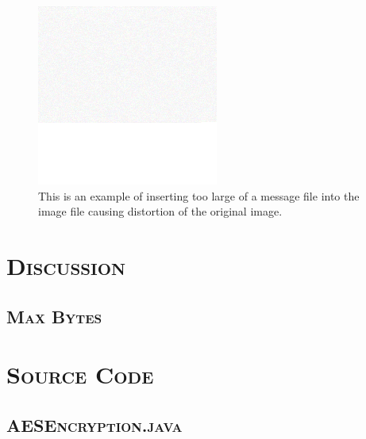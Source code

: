 \documentclass[12pt]{article}
\begin{document}
	\begin{figure}[h]
		\centering
		\includegraphics[keepaspectratio=true, width=0.8\linewidth]{image/bloob.png}
		\caption{This is an example of inserting too large of a message file into the image file causing distortion of the original image.}
	\end{figure}
	
	
	\section[Discussion]{\Large{}\selectfont\scshape Discussion}
	
	\subsection[Max Bytes]{\hspace*{1em}\large{}\selectfont\scshape Max Bytes}
	
	\section[Source Code]{\Large{}\selectfont\scshape Source Code}
	
	\subsection[AESEncryption]{\hspace*{1em}\large{}\selectfont\scshape AESEncryption.java}
	
	
\end{document}
